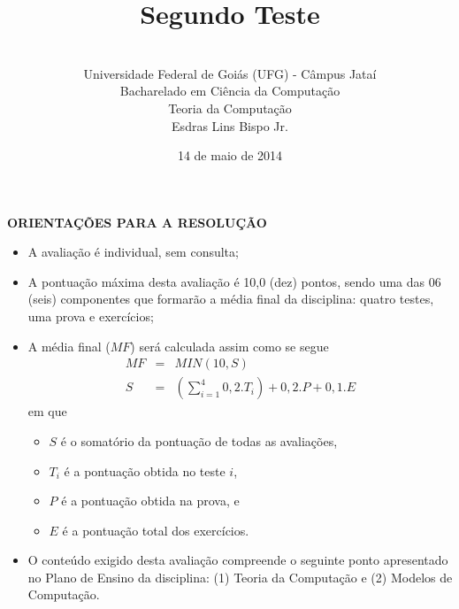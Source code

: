 \documentclass[12pt,a4paper,oneside]{article}
\author{\\Universidade Federal de Goiás (UFG) - Câmpus Jataí\\Bacharelado em Ciência da Computação \\Teoria da Computação \\Esdras Lins Bispo Jr.}
\date{14 de maio de 2014}
\title{\sc \huge Segundo Teste}
\begin{document}
\maketitle

{\bf ORIENTAÇÕES PARA A RESOLUÇÃO}

\begin{itemize}
	\item A avaliação é individual, sem consulta;
	\item A pontuação máxima desta avaliação é 10,0 (dez) pontos, sendo uma das 06 (seis) componentes que formarão a média final da disciplina: quatro testes, uma prova e exercícios;
	\item A média final ($MF$) será calculada assim como se segue
	\begin{eqnarray}
		MF & = & MIN(10, S) \nonumber \\
		S & = & (\sum_{i=1}^{4} 0,2.T_i ) + 0,2.P  + 0,1.E \nonumber
	\end{eqnarray}
	em que 
	\begin{itemize}
		\item $S$ é o somatório da pontuação de todas as avaliações,
		\item $T_i$ é a pontuação obtida no teste $i$,
		\item $P$ é a pontuação obtida na prova, e
		\item $E$ é a pontuação total dos exercícios.
	\end{itemize}
	\item O conteúdo exigido desta avaliação compreende o seguinte ponto apresentado no Plano de Ensino da disciplina: (1) Teoria da Computação e (2) Modelos de Computação.
\end{itemize}

\begin{center}
\end{center}

\newpage
\end{document}
